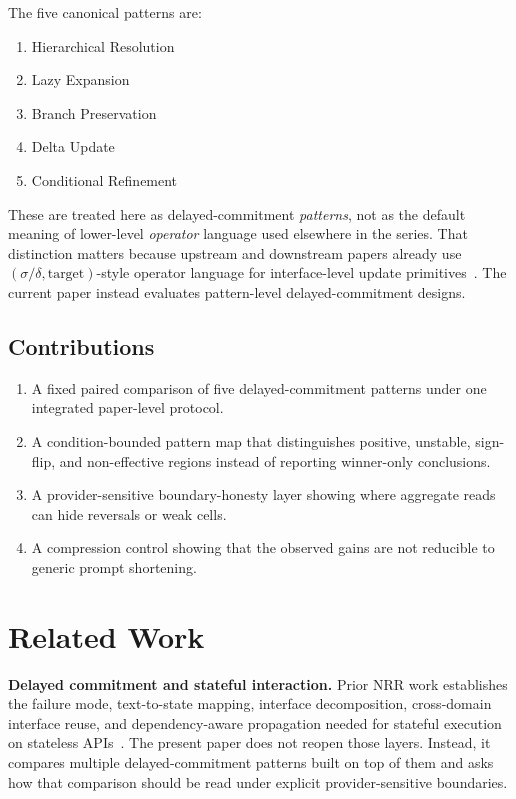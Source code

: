 \documentclass[11pt,a4paper]{article}
\begin{document}
The five canonical patterns are:
\begin{enumerate}
  \item Hierarchical Resolution
  \item Lazy Expansion
  \item Branch Preservation
  \item Delta Update
  \item Conditional Refinement
\end{enumerate}

These are treated here as delayed-commitment \emph{patterns}, not as the default meaning of lower-level \emph{operator} language used elsewhere in the series. That distinction matters because upstream and downstream papers already use \((\sigma/\delta,\text{target})\)-style operator language for interface-level update primitives~\cite{saito2026phi,saito2026transfer,saito2026coupled}. The current paper instead evaluates pattern-level delayed-commitment designs.

\subsection{Contributions}

\begin{enumerate}
  \item A fixed paired comparison of five delayed-commitment patterns under one integrated paper-level protocol.
  \item A condition-bounded pattern map that distinguishes positive, unstable, sign-flip, and non-effective regions instead of reporting winner-only conclusions.
  \item A provider-sensitive boundary-honesty layer showing where aggregate reads can hide reversals or weak cells.
  \item A compression control showing that the observed gains are not reducible to generic prompt shortening.
\end{enumerate}

\section{Related Work}
\label{sec:related}

\textbf{Delayed commitment and stateful interaction.}
Prior NRR work establishes the failure mode, text-to-state mapping, interface decomposition, cross-domain interface reuse, and dependency-aware propagation needed for stateful execution on stateless APIs~\cite{saito2025nrr,saito2026phi,saito2026ime,saito2026transfer,saito2026coupled}. The present paper does not reopen those layers. Instead, it compares multiple delayed-commitment patterns built on top of them and asks how that comparison should be read under explicit provider-sensitive boundaries.
\end{document}
